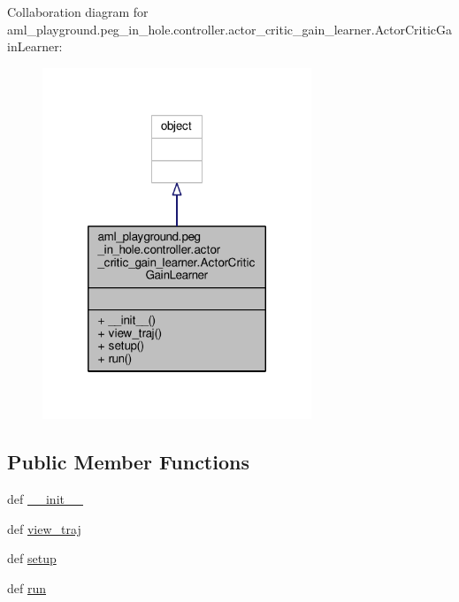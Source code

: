 Collaboration diagram for aml\-\_\-playground.\-peg\-\_\-in\-\_\-hole.\-controller.\-actor\-\_\-critic\-\_\-gain\-\_\-learner.\-Actor\-Critic\-Gain\-Learner\-:\nopagebreak
\begin{figure}[H]
\begin{center}
\leavevmode
\includegraphics[width=228pt]{classaml__playground_1_1peg__in__hole_1_1controller_1_1actor__critic__gain__learner_1_1_actor_critic_gain_learner__coll__graph}
\end{center}
\end{figure}
\subsection*{Public Member Functions}
\begin{DoxyCompactItemize}
\item 
def \hyperlink{classaml__playground_1_1peg__in__hole_1_1controller_1_1actor__critic__gain__learner_1_1_actor_critic_gain_learner_a69a85888d2f5cb4342d157005422495e}{\-\_\-\-\_\-init\-\_\-\-\_\-}
\item 
def \hyperlink{classaml__playground_1_1peg__in__hole_1_1controller_1_1actor__critic__gain__learner_1_1_actor_critic_gain_learner_a044f733d646d3cfc95cfcafaaa8b6f30}{view\-\_\-traj}
\item 
def \hyperlink{classaml__playground_1_1peg__in__hole_1_1controller_1_1actor__critic__gain__learner_1_1_actor_critic_gain_learner_aeff8a35775d39d58c772ce35242601bb}{setup}
\item 
def \hyperlink{classaml__playground_1_1peg__in__hole_1_1controller_1_1actor__critic__gain__learner_1_1_actor_critic_gain_learner_affead1a4a154401edf940588597f06af}{run}
\end{DoxyCompactItemize}


